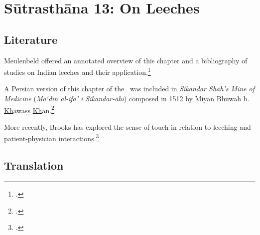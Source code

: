 
\chapter{Sūtrasthāna 13:  On Leeches}


\section{Literature} 


Meulenbeld offered an annotated overview of this chapter and a bibliography
of studies on Indian leeches and their application.\footcite[IA, 209; IB,
324, n.\,131]{meul-hist}

A Persian version of this chapter of the \SS\ was included in \emph{Sikandar
    Shāh's Mine of Medicine} (\emph{Ma`din al-ifā' i
    Sikandar-āhī}) composed in 1512 by Miyān Bhūwah b.
\underline{Kh}awāṣṣ \underline{Kh}ān.\footcites[96--109]{sidd-1959}
{azee-1971} [231--232]{stor-1971} [IB, 324,
n.\,128]{meul-hist}[8--9]{spez-2019}

More recently, Brooks has explored the sense of touch in relation to
leeching and patient-physician
interactions.\footcite{%
    broo-2020,
    broo-2020b,
    broo-2020c,
    broo-2021}

\section{Translation}

